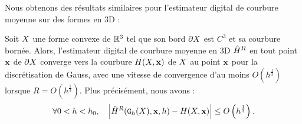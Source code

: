 %
Nous obtenons des résultats similaires pour l'estimateur digital de courbure
moyenne sur des formes en 3D :
%
\begin{theorem}{}
  \label{thm:convergence-curv-3d}
  Soit $X$ une forme convexe de $\mathbb{R}^3$ tel que son bord $\partial X$ est $C^3$ et
  sa courbure bornée. Alors, l'estimateur digital de courbure moyenne en 3D
  $\hat{H}^{R}$ en tout point $\mathbf{x}$ de $\partial X$ converge vers la
  courbure $H(X,\mathbf{x})$ de $X$ au point $\mathbf{x}$ pour la
  discrétisation de Gauss, avec une vitesse de convergence d'au moins
  $O(h^{\frac{1}{3}})$ lorsque $R = O(h^{\frac{1}{3}})$. Plus précisément, nous
  avons :
  \begin{equation}
    \forall 0 < h < h_0,
    \quad \left | \MeanCurvH{R}(\DSh, \vx, h) - \MeanCurv(\Shape, \vx) \right|
                          \le O \left(h^{\frac{1}{3}}\right). %
  \end{equation}
\end{theorem}
